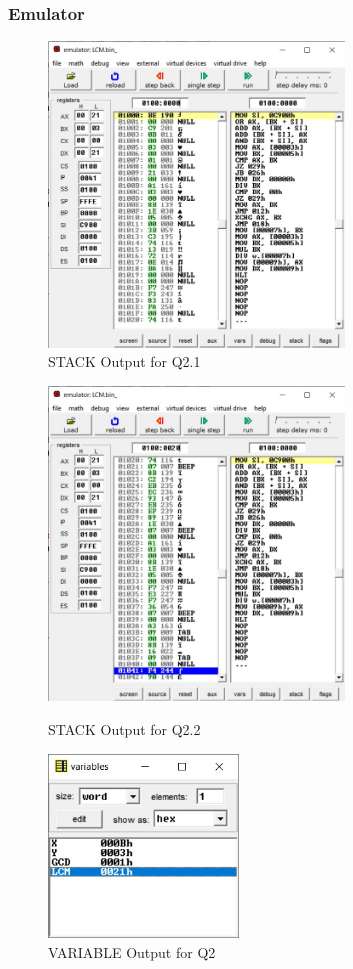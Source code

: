 \documentclass{article}
\begin{document}
\subsubsection{Emulator}
\begin{figure}[h]
\begin{center}
\includegraphics[width=0.7\textwidth]{LCM_OUT1} 
\caption{STACK Output for Q2.1 }
\end{center}
\end{figure}
\begin{figure}[h]
\begin{center}
\includegraphics[width=0.7\textwidth]{LCM_OUT2} 
\caption{STACK Output for Q2.2 }
\end{center}
\begin{center}
\includegraphics[width=0.45\textwidth]{LCM_OUT3} 
\caption{VARIABLE Output for Q2 }
\end{center}
\end{figure}
\end{document}
